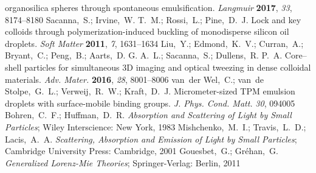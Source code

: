 \documentclass[journal=langd5,manuscript=article]{achemso}
\begin{document}
\begin{mcitethebibliography}{47}
  organosilica spheres through spontaneous emulsification. \emph{Langmuir}
  \textbf{2017}, \emph{33}, 8174--8180\relax
\mciteBstWouldAddEndPuncttrue
\mciteSetBstMidEndSepPunct{\mcitedefaultmidpunct}
{\mcitedefaultendpunct}{\mcitedefaultseppunct}\relax
\EndOfBibitem
{}
Sacanna,~S.; Irvine,~W. T.~M.; Rossi,~L.; Pine,~D.~J. Lock and key colloids
  through polymerization-induced buckling of monodisperse silicon oil droplets.
  \emph{Soft Matter} \textbf{2011}, \emph{7}, 1631--1634\relax
\mciteBstWouldAddEndPuncttrue
\mciteSetBstMidEndSepPunct{\mcitedefaultmidpunct}
{\mcitedefaultendpunct}{\mcitedefaultseppunct}\relax
\EndOfBibitem
{}
Liu,~Y.; Edmond,~K.~V.; Curran,~A.; Bryant,~C.; Peng,~B.; Aarts,~D. G. A.~L.;
  Sacanna,~S.; Dullens,~R. P.~A. Core–shell particles for simultaneous 3D
  imaging and optical tweezing in dense colloidal materials. \emph{Adv. Mater.}
  \textbf{2016}, \emph{28}, 8001--8006\relax
\mciteBstWouldAddEndPuncttrue
\mciteSetBstMidEndSepPunct{\mcitedefaultmidpunct}
{\mcitedefaultendpunct}{\mcitedefaultseppunct}\relax
\EndOfBibitem
{}
van~der Wel,~C.; van~de Stolpe,~G.~L.; Verweij,~R.~W.; Kraft,~D.~J.
  Micrometer-sized TPM emulsion droplets with surface-mobile binding groups.
  \emph{J. Phys. Cond. Matt.} \emph{30}, 094005\relax
\mciteBstWouldAddEndPuncttrue
\mciteSetBstMidEndSepPunct{\mcitedefaultmidpunct}
{\mcitedefaultendpunct}{\mcitedefaultseppunct}\relax
\EndOfBibitem
{}
Bohren,~C.~F.; Huffman,~D.~R. \emph{Absorption and Scattering of Light by Small
  Particles}; Wiley Interscience: New York, 1983\relax
\mciteBstWouldAddEndPuncttrue
\mciteSetBstMidEndSepPunct{\mcitedefaultmidpunct}
{\mcitedefaultendpunct}{\mcitedefaultseppunct}\relax
\EndOfBibitem
{}
Mishchenko,~M.~I.; Travis,~L.~D.; Lacis,~A.~A. \emph{Scattering, Absorption and
  Emission of Light by Small Particles}; Cambridge University Press: Cambridge,
  2001\relax
\mciteBstWouldAddEndPuncttrue
\mciteSetBstMidEndSepPunct{\mcitedefaultmidpunct}
{\mcitedefaultendpunct}{\mcitedefaultseppunct}\relax
\EndOfBibitem
{}
Gouesbet,~G.; Gr\'ehan,~G. \emph{Generalized Lorenz-Mie Theories};
  Springer-Verlag: Berlin, 2011\relax

\end{mcitethebibliography}
\end{document}
